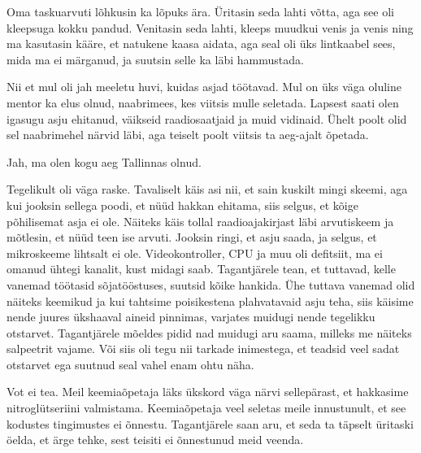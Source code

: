 Oma taskuarvuti lõhkusin ka lõpuks ära. Üritasin seda lahti võtta, aga 
see oli kleepsuga kokku pandud. Venitasin seda lahti, 
kleeps muudkui venis ja venis ning ma kasutasin kääre, et natukene 
kaasa aidata, aga seal oli üks lintkaabel sees, mida ma ei märganud, ja suutsin 
selle ka läbi hammustada.

Nii et mul oli jah meeletu huvi, kuidas asjad töötavad. Mul on üks väga oluline mentor ka elus olnud, naabrimees, kes viitsis 
mulle seletada. Lapsest saati olen igasugu asju ehitanud, 
väikseid raadiosaatjaid ja muid vidinaid. Ühelt poolt olid sel naabrimehel 
närvid läbi, aga teiselt poolt viitsis ta aeg-ajalt õpetada. 


Jah, ma olen kogu aeg Tallinnas olnud. 


Tegelikult oli väga raske. Tavaliselt käis asi nii, et sain kuskilt 
mingi skeemi, aga 
kui jooksin sellega poodi, et nüüd hakkan ehitama, siis selgus, et 
kõige põhilisemat asja ei ole. Näiteks käis tollal 
raadioajakirjast läbi arvutiskeem ja mõtlesin, et nüüd teen ise arvuti. Jooksin ringi, et asju saada, ja selgus, et mikroskeeme lihtsalt ei ole. 
Videokontroller, CPU ja muu oli defitsiit, ma ei omanud ühtegi kanalit, kust 
midagi saab. Tagantjärele tean, et tuttavad, kelle vanemad töötasid 
sõjatööstuses, suutsid kõike hankida. Ühe tuttava vanemad olid näiteks 
keemikud ja kui tahtsime poisikestena plahvatavaid asju teha, 
siis käisime nende juures ükshaaval aineid pinnimas, 
varjates muidugi nende tegelikku otstarvet. Tagantjärele mõeldes 
pidid nad muidugi aru saama, 
milleks me näiteks salpeetrit vajame. Või siis oli tegu nii tarkade 
inimestega, et teadsid veel sadat otstarvet ega suutnud seal vahel enam 
ohtu näha. 


Vot ei tea. Meil keemiaõpetaja läks ükskord väga närvi sellepärast, et 
hakkasime nitroglütseriini valmistama. Keemiaõpetaja veel seletas meile 
innustunult, et see kodustes tingimustes ei õnnestu. Tagantjärele
saan aru, et seda ta täpselt üritaski öelda, et ärge tehke, 
sest teisiti ei õnnestunud meid veenda. 

